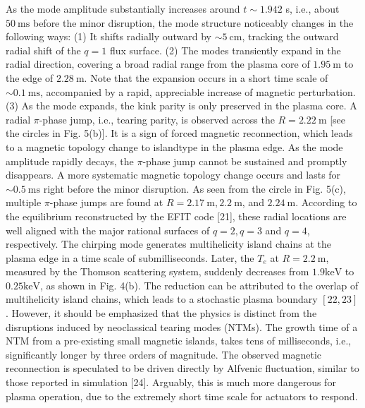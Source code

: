 \documentclass[10pt]{article}
\begin{document}
As the mode amplitude substantially increases around $t \sim 1.942$ s, i.e., about $50 \mathrm{~ms}$ before the minor disruption, the mode structure noticeably changes in the following ways: (1) It shifts radially outward by $\sim 5 \mathrm{~cm}$, tracking the outward radial shift of the $q=1$ flux surface. (2) The modes transiently expand in the radial direction, covering a broad radial range from the plasma core of $1.95 \mathrm{~m}$ to the edge of $2.28 \mathrm{~m}$. Note that the expansion occurs in a short time scale of $\sim 0.1 \mathrm{~ms}$, accompanied by a rapid, appreciable increase of magnetic perturbation. (3) As the mode expands, the kink parity is only preserved in the plasma core. A radial $\pi$-phase jump, i.e., tearing parity, is observed across the $R=2.22 \mathrm{~m}$ [see the circles in Fig. 5(b)]. It is a sign of forced magnetic reconnection, which leads to a magnetic topology change to islandtype in the plasma edge. As the mode amplitude rapidly decays, the $\pi$-phase jump cannot be sustained and promptly disappears. A more systematic magnetic topology change occurs and lasts for $\sim 0.5 \mathrm{~ms}$ right before the minor disruption. As seen from the circle in Fig. 5(c), multiple $\pi$-phase jumps are found at $R=2.17 \mathrm{~m}, 2.2 \mathrm{~m}$, and $2.24 \mathrm{~m}$. According to the equilibrium reconstructed by the EFIT code [21], these radial locations are well aligned with the major rational surfaces of $q=2, q=3$ and $q=4$, respectively. The chirping mode generates multihelicity island chains at the plasma edge in a time scale of submilliseconds. Later, the $T_{e}$ at $R=2.2 \mathrm{~m}$, measured by the Thomson scattering system, suddenly decreases from $1.9 \mathrm{keV}$ to $0.25 \mathrm{keV}$, as shown in Fig. 4(b). The reduction can be attributed to the overlap of multihelicity island chains, which leads to a stochastic plasma boundary $[22,23]$. However, it should be emphasized that the physics is distinct from the disruptions induced by neoclassical tearing modes (NTMs). The growth time of a NTM from a pre-existing small magnetic islands, takes tens of milliseconds, i.e., significantly longer by three orders of magnitude. The observed magnetic reconnection is speculated to be driven directly by Alfvenic fluctuation, similar to those reported in simulation [24]. Arguably, this is much more dangerous for plasma operation, due to the extremely short time scale for actuators to respond.
\end{document}
